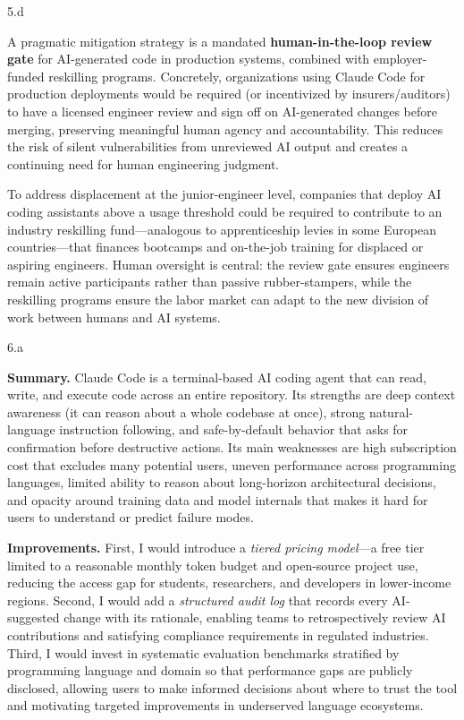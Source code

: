 \LARGE
5.d
\normalsize

\begin{answer}
  A pragmatic mitigation strategy is a mandated \textbf{human-in-the-loop review gate} for AI-generated code in production systems, combined with employer-funded reskilling programs. Concretely, organizations using Claude Code for production deployments would be required (or incentivized by insurers/auditors) to have a licensed engineer review and sign off on AI-generated changes before merging, preserving meaningful human agency and accountability. This reduces the risk of silent vulnerabilities from unreviewed AI output and creates a continuing need for human engineering judgment.

  To address displacement at the junior-engineer level, companies that deploy AI coding assistants above a usage threshold could be required to contribute to an industry reskilling fund---analogous to apprenticeship levies in some European countries---that finances bootcamps and on-the-job training for displaced or aspiring engineers. Human oversight is central: the review gate ensures engineers remain active participants rather than passive rubber-stampers, while the reskilling programs ensure the labor market can adapt to the new division of work between humans and AI systems.
\end{answer}
\clearpage

\LARGE
6.a
\normalsize

\begin{answer}
  \textbf{Summary.} Claude Code is a terminal-based AI coding agent that can read, write, and execute code across an entire repository. Its strengths are deep context awareness (it can reason about a whole codebase at once), strong natural-language instruction following, and safe-by-default behavior that asks for confirmation before destructive actions. Its main weaknesses are high subscription cost that excludes many potential users, uneven performance across programming languages, limited ability to reason about long-horizon architectural decisions, and opacity around training data and model internals that makes it hard for users to understand or predict failure modes.

  \textbf{Improvements.} First, I would introduce a \textit{tiered pricing model}---a free tier limited to a reasonable monthly token budget and open-source project use, reducing the access gap for students, researchers, and developers in lower-income regions. Second, I would add a \textit{structured audit log} that records every AI-suggested change with its rationale, enabling teams to retrospectively review AI contributions and satisfying compliance requirements in regulated industries. Third, I would invest in systematic evaluation benchmarks stratified by programming language and domain so that performance gaps are publicly disclosed, allowing users to make informed decisions about where to trust the tool and motivating targeted improvements in underserved language ecosystems.
\end{answer}

